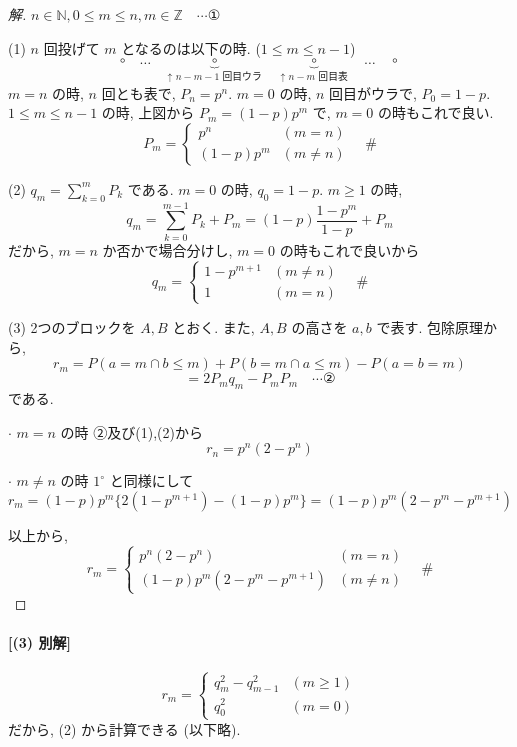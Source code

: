 \documentclass[../main.tex]{subfiles}
\begin{document}
\begin{proof}[解]
  $n \in \mathbb{N}, 0 \le m \le n, m \in \mathbb{Z} \quad \cdots ①$

  (1) $n$ 回投げて $m$ となるのは以下の時. ($1 \le m \le n-1$)
  \[
    \circ \quad \dots \quad \underbrace{\circ}_{\text{↑ } n-m-1 \text{ 回目ウラ}} \quad \underbrace{\circ}_{\text{↑ } n-m \text{ 回目表}} \quad \dots \quad \circ
  \]
  $m=n$ の時, $n$ 回とも表で, $P_n = p^n$. $m=0$ の時, $n$ 回目がウラで, $P_0 = 1-p$.
  $1 \le m \le n-1$ の時, 上図から $P_m = (1-p) p^m$ で, $m=0$ の時もこれで良い.
  \[
    P_m =
    \begin{cases} p^n & (m = n) \\ (1-p) p^m & (m \neq n)
    \end{cases}
    \quad \text{\#}
  \]

  (2) $q_m = \sum_{k=0}^m P_k$ である. $m=0$ の時, $q_0 = 1-p$. $m \ge 1$ の時,
  \[
    q_m = \sum_{k=0}^{m-1} P_k + P_m = (1-p) \frac{1-p^m}{1-p} + P_m
  \]
  だから, $m=n$ か否かで場合分けし, $m=0$ の時もこれで良いから
  \[
    q_m =
    \begin{cases} 1 - p^{m+1} & (m \neq n) \\ 1 & (m = n)
    \end{cases}
    \quad \text{\#}
  \]

  (3) 2つのブロックを $A, B$ とおく. また, $A, B$ の高さを $a, b$ で表す. 包除原理から,
  \[
    r_m = P(a=m \cap b \le m) + P(b=m \cap a \le m) - P(a=b=m)
  \]
  \[
    = 2 P_m q_m - P_m P_m \quad \cdots ②
  \]
  である.

  $\cdot$ $m=n$ の時
  ②及び(1),(2)から
  \[
    r_n = p^n (2 - p^n)
  \]

  $\cdot$ $m \neq n$ の時
  $1^\circ$ と同様にして
  \[
    r_m = (1-p)p^m \{ 2(1 - p^{m+1}) - (1-p)p^m \} = (1-p)p^m (2 - p^m - p^{m+1})
  \]

  以上から,
  \[
    r_m =
    \begin{cases} p^n (2 - p^n) & (m = n) \\ (1-p)p^m (2 - p^m - p^{m+1}) & (m \neq n)
    \end{cases}
    \quad \text{\#}
  \]
\end{proof}

\paragraph{[(3) 別解]}
\[
  r_m =
  \begin{cases} q_m^2 - q_{m-1}^2 & (m \ge 1) \\ q_0^2 & (m = 0)
  \end{cases}
\]
だから, (2) から計算できる (以下略).
\end{document}

